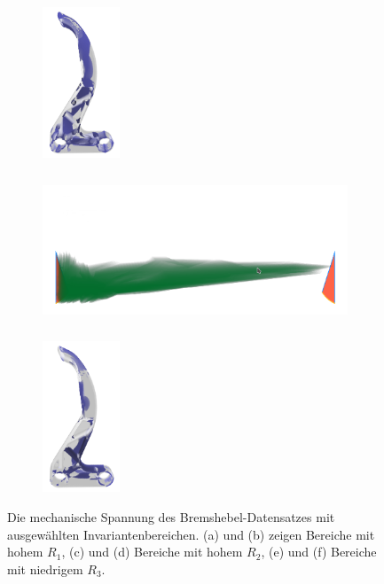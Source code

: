 \documentclass[a4paper,fontsize=12pt,toc=bib,halfparskip]{scrartcl}
\begin{document}
\begin{figure}
\begin{subfigure}{0.49\textwidth}
		\subcaption{}
		\label{BremshebelRInvariant2}
	\end{subfigure}
	\hspace*{\fill}
	\begin{subfigure}{0.49\textwidth}
		\centering
		\includegraphics[height=4.5cm]{pictures/results/Bremshebel_R_Object2.png}
		\subcaption{}
		\label{BremshebelRObject2}
	\end{subfigure}
	\medskip
	\begin{subfigure}{0.49\textwidth}
		\centering
		\includegraphics[height=4.5cm]{pictures/results/Bremshebel_R_InvariantSpace3.png}
		\subcaption{}
		\label{BremshebelRInvariant3}
	\end{subfigure}
	\hspace*{\fill}
	\begin{subfigure}{0.49\textwidth}
		\centering
		\includegraphics[height=4.5cm]{pictures/results/Bremshebel_R_Object3.png}
		\subcaption{}
		\label{BremshebelRObject3}
	\end{subfigure}
	\caption{Die mechanische Spannung des Bremshebel-Datensatzes mit ausgew\"ahlten Invariantenbereichen. (a) und (b) zeigen Bereiche mit hohem $R_1$, (c) und (d) Bereiche mit hohem $R_2$, (e) und (f) Bereiche mit niedrigem $R_3$.}
	\label{BremshebelRInteraction}
\end{figure}
\end{document}
